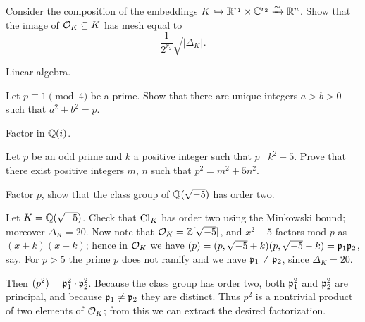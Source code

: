 \begin{problem} 
	\label{prob:OK_linalg}
	Consider the composition of the embeddings $K \hookrightarrow \mathbb R^{r_1} \times \mathbb C^{r_2} \xrightarrow{\sim} \mathbb R^n$.
	Show that the image of $\mathcal O_K \subseteq K$ has mesh equal to
	\[ \frac{1}{2^{r_2}} \sqrt{\left\lvert \Delta_K \right\rvert}. \]
	\begin{hint}
		Linear algebra.
	\end{hint}
\end{problem}

\begin{problem}
	Let $p \equiv 1 \pmod 4$ be a prime.
	Show that there are unique integers $a > b > 0$ such that $a^2+b^2=p$.
	\begin{hint}
		Factor in $\mathbb Q(i)$.
	\end{hint}
\end{problem}


\begin{problem}
	Let $p$ be an odd prime and $k$ a positive integer such that $p \mid k^2+5$.
	Prove that there exist positive integers $m$, $n$ such that $p^2 = m^2+5n^2$.
	\begin{hint}
		Factor $p$, show that the class group of $\mathbb Q(\sqrt{-5})$ has order two.
	\end{hint}
	\begin{sol}
		Let $K = \mathbb Q(\sqrt{-5})$. Check that $\mathrm{Cl}_K$ has order two using the Minkowski bound;
		moreover $\Delta_K = 20$.
		Now note that $\mathcal O_K = \mathbb Z[\sqrt{-5}]$, and $x^2+5$ factors mod $p$ as $(x+k)(x-k)$;
		hence in $\mathcal O_K$ we have $(p) = (p, \sqrt{-5}+k)(p, \sqrt{-5}-k) = \mathfrak p_1 \mathfrak p_2$, say.
		For $p > 5$ the prime $p$ does not ramify and we have $\mathfrak p_1 \neq \mathfrak p_2$, since $\Delta_K = 20$.

		Then $(p^2) = \mathfrak p_1^2 \cdot \mathfrak p_2^2$. Because the class group has order two,
		both $\mathfrak p_1^2$ and $\mathfrak p_2^2$ are principal, and because $\mathfrak p_1 \neq \mathfrak p_2$ they are distinct.
		Thus $p^2$ is a nontrivial product of two elements of $\mathcal O_K$; from this we can extract the desired factorization.
	\end{sol}
\end{problem}

